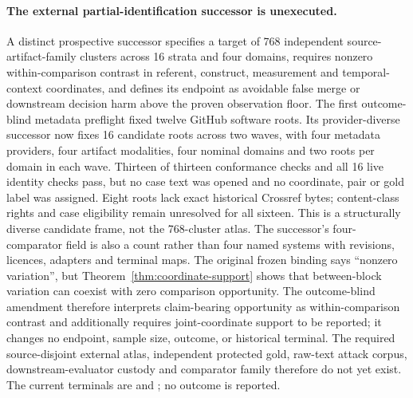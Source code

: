 \paragraph{The external partial-identification successor is unexecuted.}
A distinct prospective successor specifies a target of 768 independent
source-artifact-family clusters across 16 strata and four domains, requires
nonzero within-comparison contrast in referent, construct, measurement and temporal-context
coordinates, and defines its endpoint as avoidable false merge or downstream
decision harm above the proven observation floor. The first outcome-blind
metadata preflight fixed twelve GitHub software roots. Its provider-diverse
successor now fixes 16 candidate roots across two waves, with four metadata
providers, four artifact modalities, four nominal domains and two roots per
domain in each wave. Thirteen of thirteen conformance checks and all 16 live
identity checks pass, but no case text was opened and no coordinate, pair or
gold label was assigned. Eight roots lack exact historical Crossref bytes;
content-class rights and case eligibility remain unresolved for all sixteen.
This is a structurally diverse candidate frame, not the 768-cluster atlas.
The successor's four-comparator field is also a count rather than four named systems with
revisions, licences, adapters and terminal maps. The original frozen binding
says ``nonzero variation'', but Theorem~\ref{thm:coordinate-support} shows
that between-block variation can coexist with zero comparison opportunity.
The outcome-blind amendment therefore interprets claim-bearing opportunity as
within-comparison contrast and additionally requires joint-coordinate support
to be reported; it changes no endpoint, sample size, outcome, or historical
terminal. The required source-disjoint
external atlas, independent protected gold, raw-text attack corpus,
downstream-evaluator custody and comparator family therefore do not yet exist.
The current terminals are
and ; no outcome is reported.

